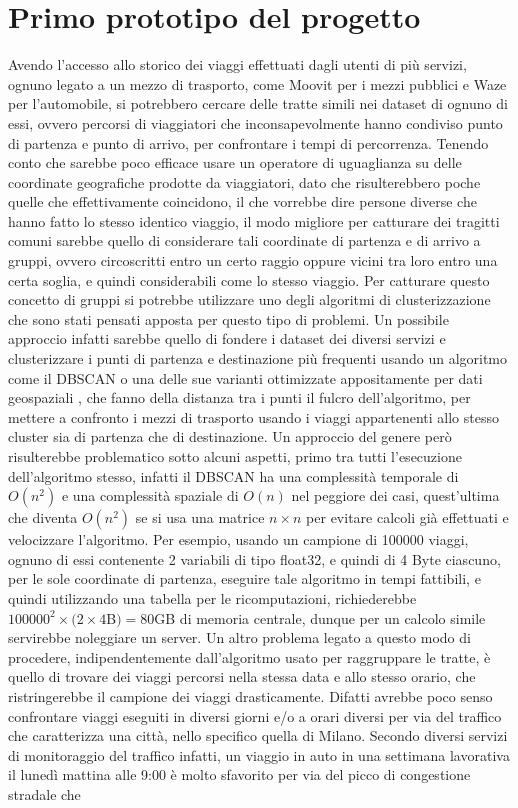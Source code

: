 \section{Primo prototipo del progetto}

Avendo l'accesso allo storico dei viaggi effettuati dagli utenti di più servizi, ognuno legato a un mezzo di trasporto, come Moovit per i mezzi pubblici e Waze per l'automobile, si potrebbero cercare delle tratte simili nei dataset di ognuno di essi, ovvero percorsi di viaggiatori che inconsapevolmente hanno condiviso punto di partenza e punto di arrivo, per confrontare i tempi di percorrenza. Tenendo conto che sarebbe poco efficace usare un operatore di uguaglianza su delle coordinate geografiche prodotte da viaggiatori, dato che risulterebbero poche quelle che effettivamente coincidono, il che vorrebbe dire persone diverse che hanno fatto lo stesso identico viaggio, il modo migliore per catturare dei tragitti comuni sarebbe quello di considerare tali coordinate di partenza e di arrivo a gruppi, ovvero circoscritti entro un certo raggio oppure vicini tra loro entro una certa soglia, e quindi considerabili come lo stesso viaggio. Per catturare questo concetto di gruppi si potrebbe utilizzare uno degli algoritmi di clusterizzazione che sono stati pensati apposta per questo tipo di problemi. Un possibile approccio infatti sarebbe quello di fondere i dataset dei diversi servizi e clusterizzare i punti di partenza e destinazione più frequenti usando un algoritmo come il DBSCAN \cite{ester1996density} o una delle sue varianti ottimizzate appositamente per dati geospaziali \cite{zhou2000combining}\cite{borah2004improved}, che fanno della distanza tra i punti il fulcro dell'algoritmo, per mettere a confronto i mezzi di trasporto usando i viaggi appartenenti allo stesso cluster sia di partenza che di destinazione. Un approccio del genere però risulterebbe problematico sotto alcuni aspetti, primo tra tutti l'esecuzione dell'algoritmo stesso, infatti il DBSCAN ha una complessità temporale di $O(n^{2})$ e una complessità spaziale di $O(n)$ nel peggiore dei casi, quest'ultima che diventa $O(n^2)$ se si usa una matrice $n \times n$ per evitare calcoli già effettuati e velocizzare l'algoritmo. Per esempio, usando un campione di 100000 viaggi, ognuno di essi contenente 2 variabili di tipo float32, e quindi di 4 Byte ciascuno, per le sole coordinate di partenza, eseguire tale algoritmo in tempi fattibili, e quindi utilizzando una tabella per le ricomputazioni, richiederebbe $100000^{2} \times (2 \times 4$B$) = 80 $GB di memoria centrale, dunque per un calcolo simile servirebbe noleggiare un server. Un altro problema legato a questo modo di procedere, indipendentemente dall'algoritmo usato per raggruppare le tratte, è quello di trovare dei viaggi percorsi nella stessa data e allo stesso orario, che ristringerebbe il campione dei viaggi drasticamente. Difatti avrebbe poco senso confrontare viaggi eseguiti in diversi giorni e/o a orari diversi per via del traffico che caratterizza una città, nello specifico quella di Milano. Secondo diversi servizi di monitoraggio del traffico infatti, un viaggio in auto in una settimana lavorativa il lunedì mattina alle 9:00 è molto sfavorito per via del picco di congestione stradale che 